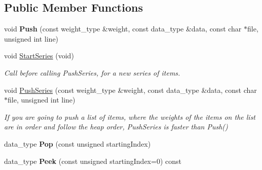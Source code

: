 \subsection*{Public Member Functions}
\begin{DoxyCompactItemize}
\item 
\hypertarget{class_data_structures_1_1_heap_aa01a134957e811c1af719805d493b700}{void {\bfseries Push} (const weight\-\_\-type \&weight, const data\-\_\-type \&data, const char $\ast$file, unsigned int line)}\label{class_data_structures_1_1_heap_aa01a134957e811c1af719805d493b700}

\item 
\hypertarget{class_data_structures_1_1_heap_a15fd87c401e7bbe80ebec8a316d2ede7}{void \hyperlink{class_data_structures_1_1_heap_a15fd87c401e7bbe80ebec8a316d2ede7}{Start\-Series} (void)}\label{class_data_structures_1_1_heap_a15fd87c401e7bbe80ebec8a316d2ede7}

\begin{DoxyCompactList}\small\item\em Call before calling Push\-Series, for a new series of items. \end{DoxyCompactList}\item 
\hypertarget{class_data_structures_1_1_heap_a1fed605d6f9b5afc6e3e63f449afade6}{void \hyperlink{class_data_structures_1_1_heap_a1fed605d6f9b5afc6e3e63f449afade6}{Push\-Series} (const weight\-\_\-type \&weight, const data\-\_\-type \&data, const char $\ast$file, unsigned int line)}\label{class_data_structures_1_1_heap_a1fed605d6f9b5afc6e3e63f449afade6}

\begin{DoxyCompactList}\small\item\em If you are going to push a list of items, where the weights of the items on the list are in order and follow the heap order, Push\-Series is faster than Push() \end{DoxyCompactList}\item 
\hypertarget{class_data_structures_1_1_heap_a9ce961937f06f77b7ad82a02ce8d64ac}{data\-\_\-type {\bfseries Pop} (const unsigned starting\-Index)}\label{class_data_structures_1_1_heap_a9ce961937f06f77b7ad82a02ce8d64ac}

\item 
\hypertarget{class_data_structures_1_1_heap_a99bc18efa747659ec6891ef056d8a4ab}{data\-\_\-type {\bfseries Peek} (const unsigned starting\-Index=0) const }\label{class_data_structures_1_1_heap_a99bc18efa747659ec6891ef056d8a4ab}


\end{DoxyCompactItemize}
